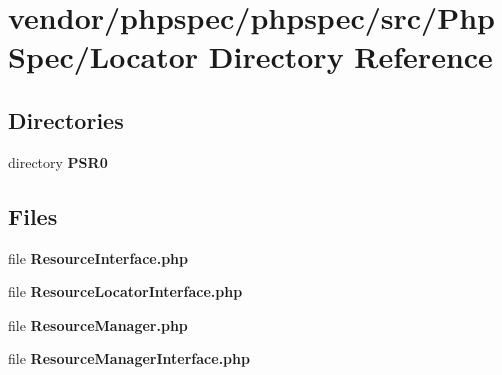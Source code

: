 \section{vendor/phpspec/phpspec/src/\+Php\+Spec/\+Locator Directory Reference}
\label{dir_5790dde7b2dfe6cc9e064a76724c6fcc}
\subsection*{Directories}
\begin{DoxyCompactItemize}
\item 
directory {\bf P\+S\+R0}
\end{DoxyCompactItemize}
\subsection*{Files}
\begin{DoxyCompactItemize}
\item 
file {\bf Resource\+Interface.\+php}
\item 
file {\bf Resource\+Locator\+Interface.\+php}
\item 
file {\bf Resource\+Manager.\+php}
\item 
file {\bf Resource\+Manager\+Interface.\+php}
\end{DoxyCompactItemize}
